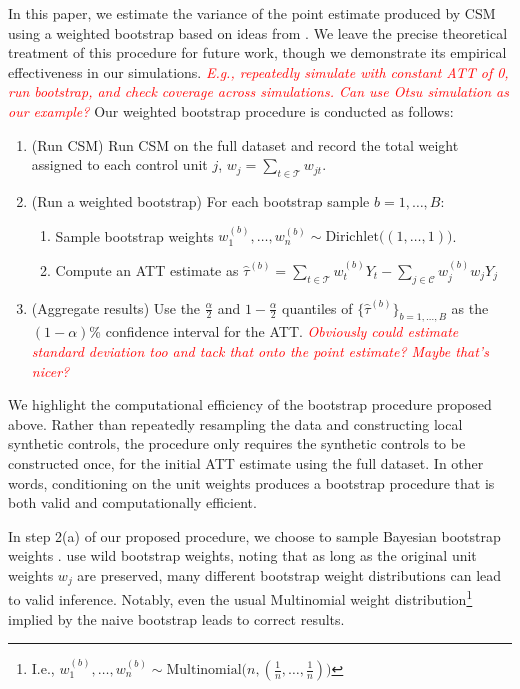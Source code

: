 \documentclass{article}
\newcommand{\note}[1]{\textcolor{red}{\textit{#1}}}
\begin{document}
In this paper, we estimate the variance of the point estimate produced by CSM using a weighted bootstrap based on ideas from \citet{otsu2017bootstrap}.
We leave the precise theoretical treatment of this procedure for future work, though we demonstrate its empirical effectiveness in our simulations.
\note{E.g., repeatedly simulate with constant ATT of 0, run bootstrap, and check coverage across simulations. Can use Otsu simulation as our example?}
Our weighted bootstrap procedure is conducted as follows:
\begin{enumerate}
    \item (Run CSM) Run CSM on the full dataset and record the total weight assigned to each control unit $j$, $w_j = \sum_{t \in \mathcal{T}} w_{jt}$.
    \item (Run a weighted bootstrap) For each bootstrap sample $b = 1, \dots, B$:
    \begin{enumerate}
        \item Sample bootstrap weights $w^{(b)}_1, \dots, w^{(b)}_n \sim \text{Dirichlet}\Big((1, \dots, 1)\Big)$.
        \item Compute an ATT estimate as $\hat{\tau}^{(b)} = \sum_{t \in \mathcal{T}} w_t^{(b)} Y_t - \sum_{j \in \mathcal{C}} w_j^{(b)} w_j Y_j$
    \end{enumerate}
    \item (Aggregate results) Use the $\frac{\alpha}{2}$ and $1-\frac{\alpha}{2}$ quantiles of $\{\hat{\tau}^{(b)}\}_{b = 1, \dots, B}$ as the $(1-\alpha)$\% confidence interval for the ATT. \note{Obviously could estimate standard deviation too and tack that onto the point estimate? Maybe that's nicer?}
\end{enumerate}

We highlight the computational efficiency of the bootstrap procedure proposed above.
Rather than repeatedly resampling the data and constructing local synthetic controls, the procedure only requires the synthetic controls to be constructed once, for the initial ATT estimate using the full dataset.
In other words, conditioning on the unit weights produces a bootstrap procedure that is both valid and computationally efficient.

In step 2(a) of our proposed procedure, we choose to sample Bayesian bootstrap weights \citep{rubin1981bayesian}.
\citet{otsu2017bootstrap} use wild bootstrap weights, noting that as long as the original unit weights $w_j$ are preserved, many different bootstrap weight distributions can lead to valid inference.
Notably, even the usual Multinomial weight distribution\footnote{I.e., $w^{(b)}_1, \dots, w^{(b)}_n \sim \text{Multinomial}\Big(n, (\frac{1}{n}, \dots, \frac{1}{n})\Big)$} implied by the naive bootstrap leads to correct results.
\end{document}
